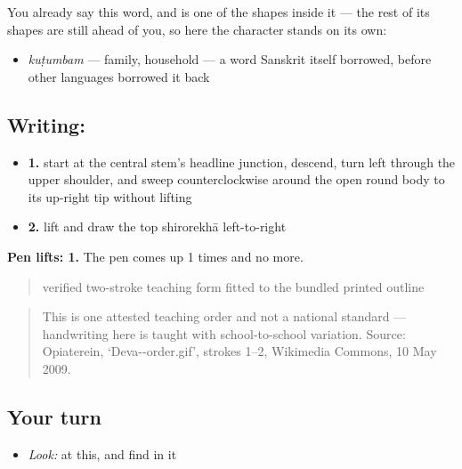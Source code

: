 You already say this word, and  is one of the shapes inside it — the rest of its shapes are still ahead of you, so here the character stands on its own:

\begin{itemize}
\raggedright
  \item \emph{kuṭumbam} — family, household — a word Sanskrit itself borrowed, before other languages borrowed it back
\end{itemize}

\subsection*{Writing: }

\begin{itemize}
\raggedright
  \item \textbf{1.} start at the central stem's headline junction, descend, turn left through the upper shoulder, and sweep counterclockwise around the open round body to its up-right tip without lifting
  \item \textbf{2.} lift and draw the top shirorekhā left-to-right
\end{itemize}

\textbf{Pen lifts: 1.} The pen comes up 1 times and no more.

\begin{quote}
verified two-stroke teaching form fitted to the bundled printed outline
\end{quote}

\begin{quote}
This is one attested teaching order and not a national standard — handwriting here is taught with school-to-school variation. Source: Opiaterein, ‘Deva--order.gif’, strokes 1–2, Wikimedia Commons, 10 May 2009.
\end{quote}

\subsection*{Your turn}
\begin{itemize}
\raggedright
  \item \emph{Look:} at this, and find  in it
\end{itemize}

\begin{quote}
\end{quote}

